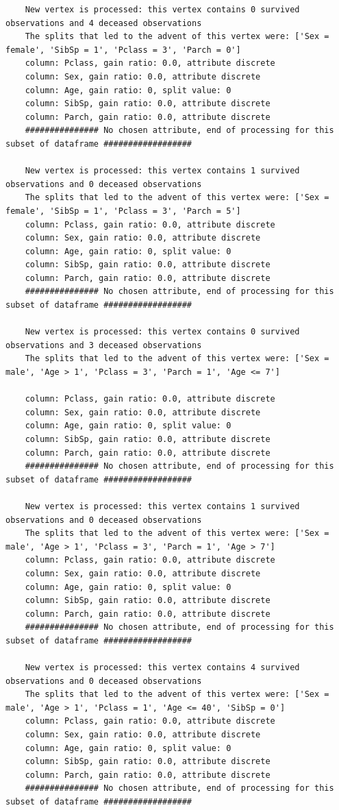 \documentclass[12pt]{article}
\begin{document}
\begin{verbatim}
	New vertex is processed: this vertex contains 0 survived observations and 4 deceased observations
	The splits that led to the advent of this vertex were: ['Sex = female', 'SibSp = 1', 'Pclass = 3', 'Parch = 0']
	column: Pclass, gain ratio: 0.0, attribute discrete
	column: Sex, gain ratio: 0.0, attribute discrete
	column: Age, gain ratio: 0, split value: 0
	column: SibSp, gain ratio: 0.0, attribute discrete
	column: Parch, gain ratio: 0.0, attribute discrete
	############### No chosen attribute, end of processing for this subset of dataframe ##################
	
	New vertex is processed: this vertex contains 1 survived observations and 0 deceased observations
	The splits that led to the advent of this vertex were: ['Sex = female', 'SibSp = 1', 'Pclass = 3', 'Parch = 5']
	column: Pclass, gain ratio: 0.0, attribute discrete
	column: Sex, gain ratio: 0.0, attribute discrete
	column: Age, gain ratio: 0, split value: 0
	column: SibSp, gain ratio: 0.0, attribute discrete
	column: Parch, gain ratio: 0.0, attribute discrete
	############### No chosen attribute, end of processing for this subset of dataframe ##################
	
	New vertex is processed: this vertex contains 0 survived observations and 3 deceased observations
	The splits that led to the advent of this vertex were: ['Sex = male', 'Age > 1', 'Pclass = 3', 'Parch = 1', 'Age <= 7']
	
	column: Pclass, gain ratio: 0.0, attribute discrete
	column: Sex, gain ratio: 0.0, attribute discrete
	column: Age, gain ratio: 0, split value: 0
	column: SibSp, gain ratio: 0.0, attribute discrete
	column: Parch, gain ratio: 0.0, attribute discrete
	############### No chosen attribute, end of processing for this subset of dataframe ##################
	
	New vertex is processed: this vertex contains 1 survived observations and 0 deceased observations
	The splits that led to the advent of this vertex were: ['Sex = male', 'Age > 1', 'Pclass = 3', 'Parch = 1', 'Age > 7']
	column: Pclass, gain ratio: 0.0, attribute discrete
	column: Sex, gain ratio: 0.0, attribute discrete
	column: Age, gain ratio: 0, split value: 0
	column: SibSp, gain ratio: 0.0, attribute discrete
	column: Parch, gain ratio: 0.0, attribute discrete
	############### No chosen attribute, end of processing for this subset of dataframe ##################
	
	New vertex is processed: this vertex contains 4 survived observations and 0 deceased observations
	The splits that led to the advent of this vertex were: ['Sex = male', 'Age > 1', 'Pclass = 1', 'Age <= 40', 'SibSp = 0']
	column: Pclass, gain ratio: 0.0, attribute discrete
	column: Sex, gain ratio: 0.0, attribute discrete
	column: Age, gain ratio: 0, split value: 0
	column: SibSp, gain ratio: 0.0, attribute discrete
	column: Parch, gain ratio: 0.0, attribute discrete
	############### No chosen attribute, end of processing for this subset of dataframe ##################
	

\end{verbatim}
\end{document}
